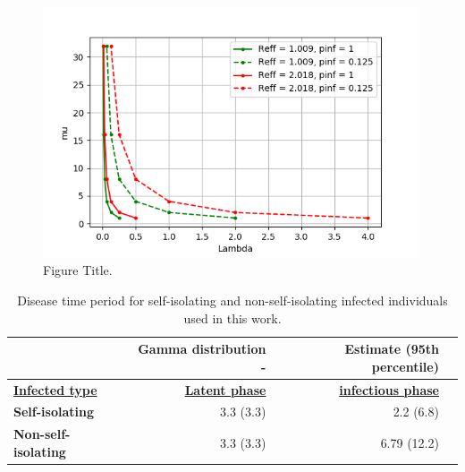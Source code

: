 \documentclass[sr]{drdc-report}
\begin{document}
\begin{figure}
  \includegraphics[width=0.99\textwidth, keepaspectratio=true]{figures/plt_muvslambda}
  \caption{Figure Title.}\label{fig_plt_muvslambda}
\end{figure}

\begin{table}
\centering
\caption{Disease time period for self-isolating and non-self-isolating infected individuals used in this work.}\label{table_diseasePhase}
\begin{tabular}{lrrl}
& Gamma distribution {   } - &Estimate (95th percentile)\\
\hline
\textbf{\underline{Infected type}} & \textbf{\underline{Latent phase}} & \textbf{\underline{infectious phase}}\\
\textbf{Self-isolating} & 3.3 (3.3) & 2.2 (6.8)\\
\textbf{Non-self-isolating} & 3.3 (3.3) & 6.79 (12.2)\\
\hline
\end{tabular}
\end{table}
\end{document}
